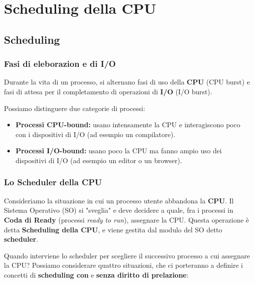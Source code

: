 \chapter{Scheduling della CPU}
\section{Scheduling}
\subsection{Fasi di eleborazion e di I/O}
Durante la vita di un processo, si alternano fasi di uso della \textbf{CPU} (CPU burst) e fasi di attesa per il completamento di operazioni di \textbf{I/O} (I/O burst). 

Possiamo distinguere due categorie di processi:

\begin{itemize}
    \item \textbf{Processi CPU-bound:} usano intensamente la CPU e interagiscono poco con i dispositivi di I/O (ad esempio un compilatore).
    \item \textbf{Processi I/O-bound:} usano poco la CPU ma fanno ampio uso dei dispositivi di I/O (ad esempio un editor o un browser).
\end{itemize}


\subsection{Lo Scheduler della CPU}
Consideriamo la situazione in cui un processo utente abbandona la \textbf{CPU}. Il Sistema Operativo (SO) si "sveglia" e deve decidere a quale, fra i processi in \textbf{Coda di Ready} (processi \emph{ready to run}), assegnare la CPU. Questa operazione è detta \textbf{Scheduling della CPU}, e viene gestita dal modulo del SO detto \textbf{scheduler}.

Quando interviene lo scheduler per scegliere il successivo processo a cui assegnare la CPU? Possiamo considerare quattro situazioni, che ci porteranno a definire i concetti di \textbf{scheduling con} e \textbf{senza diritto di prelazione}:

